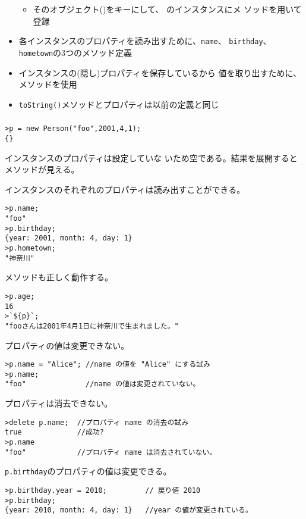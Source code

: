 \begin{frame}[containsverbatim]
\begin{frame}[containsverbatim]
\begin{itemize}
\begin{itemize}
         \item そのオブジェクト()をキーにして、
               のインスタンスにメ
               ソッドを用いて登録
        \end{itemize}
  \item 各インスタンスのプロパティを読み出すために、\texttt{name}、
        \texttt{birthday}、\texttt{hometown}の3つのメソッド定義
  \item インスタンスの(隠し)プロパティを保存しているから
        値を取り出すために、メソッドを使用
  \item \texttt{toString()}メソッドとプロパティは以前の定義と同じ
 \end{itemize}
\end{frame}
\begin{frame}[containsverbatim]
 \frametitle{}
\begin{Verbatim}
>p = new Person("foo",2001,4,1);
{}
\end{Verbatim}
インスタンスのプロパティは設定していな
 いため空である。結果を展開するとメソッドが見える。

インスタンスのそれぞれのプロパティは読み出すことができる。
\begin{Verbatim}
>p.name;
"foo"
>p.birthday;
{year: 2001, month: 4, day: 1}
>p.hometown;
"神奈川"
\end{Verbatim}
 メソッドも正しく動作する。
\begin{Verbatim}
>p.age;
16
>`${p}`;
"fooさんは2001年4月1日に神奈川で生まれました。"
\end{Verbatim}
プロパティの値は変更できない。
\begin{Verbatim}
>p.name = "Alice"; //name の値を "Alice" にする試み
>p.name;
"foo"              //name の値は変更されていない。
\end{Verbatim}
プロパティは消去できない。
\begin{Verbatim}
>delete p.name;  //プロパティ name の消去の試み
true             //成功?
>p.name
"foo"            //プロパティ name は消去されていない。
\end{Verbatim}
 \texttt{p.birthday}のプロパティの値は変更できる。
\begin{Verbatim}
>p.birthday.year = 2010;         // 戻り値 2010
>p.birthday;
{year: 2010, month: 4, day: 1}   //year の値が変更されている。
\end{Verbatim}
\end{frame}

\end{frame}
